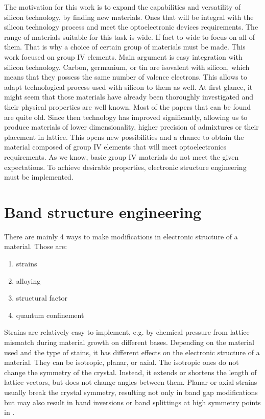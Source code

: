 The motivation for this work is to expand the capabilities and versatility of silicon technology, by finding new materials. Ones that will be integral with the silicon technology process and meet the optoelectronic devices requirements. The range of materials suitable for this task is wide. If fact to wide to focus on all of them. That is why a choice of certain group of materials must be made. This work focused on group IV elements. Main argument is easy integration with silicon technology. Carbon, germanium, or tin are isovalent with silicon, which means that they possess the same number of valence electrons. This allows to adapt technological process used with silicon to them as well. At first glance, it might seem that those materials have already been thoroughly investigated and their physical properties are well known. Most of the papers that can be found are quite old. Since then technology has improved significantly, allowing us to produce materials of lower dimensionality, higher precision of admixtures or their placement in lattice. This opens new possibilities and a chance to obtain the material composed of group IV elements that will meet optoelectronics requirements. As we know, basic group IV materials do not meet the given expectations. To achieve desirable properties, electronic structure engineering must be implemented.
\ornament
\section{Band structure engineering}

There are mainly 4 ways to make modifications in electronic structure of a material. Those are:
\begin{enumerate}
	\item strains 
	\item alloying
	\item structural factor
	\item quantum confinement
\end{enumerate}

Strains are relatively easy to implement, e.g. by chemical pressure from lattice mismatch during material growth on different bases. Depending on the material used and the type of stains, it has different effects on the electronic structure of a material. They can be isotropic, planar, or axial. The isotropic ones do not change the symmetry of the crystal. Instead, it extends or shortens the length of lattice vectors, but does not change angles between them. Planar or axial strains usually break the crystal symmetry, resulting not only in band gap modifications but may also result in band inversions or band splittings at high symmetry points in \BZ.

